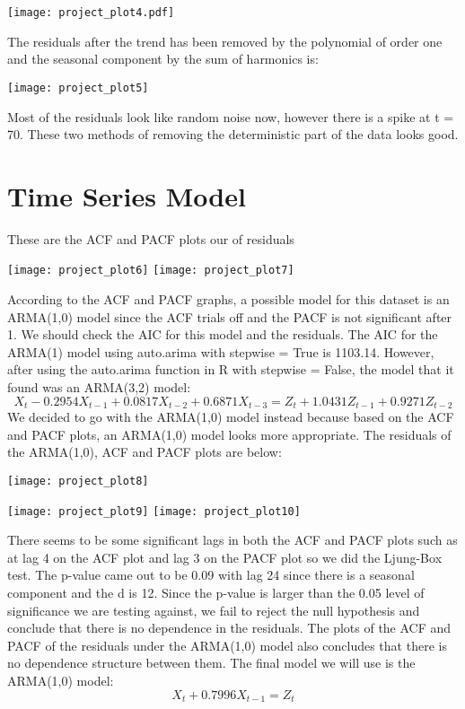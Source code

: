 \documentclass{article}
\begin{document}
\texttt{[image: project\_plot4.pdf]}

The residuals after the trend has been removed by the polynomial of order one and the seasonal component by the sum of harmonics is:

\texttt{[image: project\_plot5]}

Most of the residuals look like random noise now, however there is a spike at t = 70. These two methods of removing the deterministic part of the data looks good. 

\section*{Time Series Model}

These are the ACF and PACF plots our of residuals

\texttt{[image: project\_plot6]}
\texttt{[image: project\_plot7]}

According to the ACF and PACF graphs, a possible model for this dataset is an ARMA(1,0) model since the ACF trials off and the PACF is not significant after 1. We should check the AIC for this model and the residuals. The AIC for the ARMA(1) model using auto.arima with stepwise = True is 1103.14. However, after using the auto.arima function in R with stepwise = False, the model that it found was an ARMA(3,2) model: $$X_t -0.2954X_{t-1} + 0.0817X_{t-2} + 0.6871X_{t-3} = Z_t + 1.0431Z_{t-1} + 0.9271Z_{t-2}$$ We decided to go with the ARMA(1,0) model instead because based on the ACF and PACF plots, an ARMA(1,0) model looks more appropriate. The residuals of the ARMA(1,0), ACF and PACF plots are below: 

\texttt{[image: project\_plot8]}

\texttt{[image: project\_plot9]}
\texttt{[image: project\_plot10]}

There seems to be some significant lags in both the ACF and PACF plots such as at lag 4 on the ACF plot and lag 3 on the PACF plot so we did the Ljung-Box test. The p-value came out to be 0.09 with lag 24 since there is a seasonal component and the d is 12. Since the p-value is larger than the 0.05 level of significance we are testing against, we fail to reject the null hypothesis and conclude that there is no dependence in the residuals. The plots of the ACF and PACF of the residuals under the ARMA(1,0) model also concludes that there is no dependence structure between them. The final model we will use is the ARMA(1,0) model: $$X_t + 0.7996X_{t-1} = Z_t$$
\end{document}
